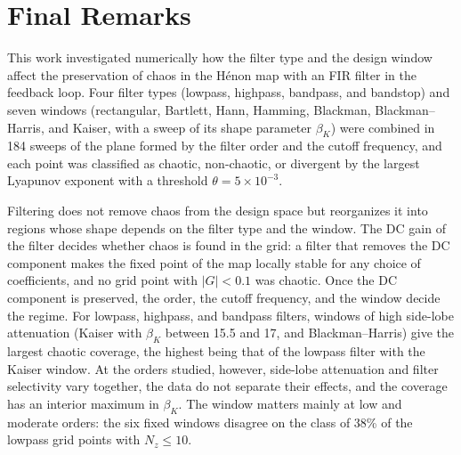 \documentclass[journal]{IEEEtran}
\begin{document}
\section{Final Remarks}\label{sec:conclusion}
This work investigated numerically how the filter type and the design window
affect the preservation of chaos in the H\'enon map with an FIR filter in the
feedback loop. Four filter types (lowpass, highpass, bandpass, and bandstop) and
seven windows (rectangular, Bartlett, Hann, Hamming, Blackman,
Blackman--Harris, and Kaiser, with a sweep of its shape parameter $\beta_K$)
were combined in 184 sweeps of the plane formed by the filter order and the
cutoff frequency, and each point was classified as chaotic, non-chaotic, or
divergent by the largest Lyapunov exponent with a threshold
$\theta=5\times10^{-3}$.

Filtering does not remove chaos from the design space but reorganizes it into regions
whose shape depends on the filter type and the window. The DC gain of the
filter decides whether chaos is found in the grid: a filter that removes the DC
component makes the fixed point of the map locally stable for any choice of
coefficients, and no grid point with $|G|<0.1$ was chaotic. Once the DC
component is preserved, the order, the cutoff frequency, and the window decide
the regime. For lowpass,
highpass, and bandpass filters, windows of high side-lobe attenuation (Kaiser
with $\beta_K$ between 15.5 and 17, and Blackman--Harris) give the largest
chaotic coverage, the highest being that of the lowpass filter with the Kaiser
window. At the orders studied, however, side-lobe attenuation and filter
selectivity vary together, the data do not separate their effects, and the
coverage has an interior maximum in $\beta_K$. The window matters mainly at low
and moderate orders: the six fixed windows disagree on the class of 38\% of the
lowpass grid points with $N_z\le10$.
\end{document}
